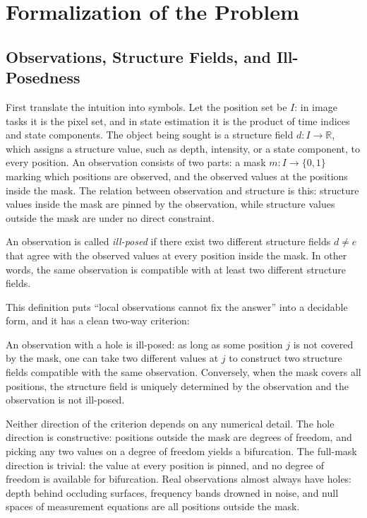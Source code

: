 \section{Formalization of the Problem}
\label{ch:formalize}

\subsection{Observations, Structure Fields, and Ill-Posedness}

First translate the intuition into symbols. Let the position set be $I$: in image tasks it is the pixel set, and in state estimation it is the product of time indices and state components. The object being sought is a structure field $d : I \to \mathbb{R}$, which assigns a structure value, such as depth, intensity, or a state component, to every position. An observation consists of two parts: a mask $m : I \to \{0, 1\}$ marking which positions are observed, and the observed values at the positions inside the mask. The relation between observation and structure is this: structure values inside the mask are pinned by the observation, while structure values outside the mask are under no direct constraint.

\begin{defn}
An observation is called \emph{ill-posed} if there exist two different structure fields $d \neq e$ that agree with the observed values at every position inside the mask. In other words, the same observation is compatible with at least two different structure fields.
\end{defn}

This definition puts ``local observations cannot fix the answer'' into a decidable form, and it has a clean two-way criterion:

\begin{uprop}
An observation with a hole is ill-posed: as long as some position $j$ is not covered by the mask, one can take two different values at $j$ to construct two structure fields compatible with the same observation. Conversely, when the mask covers all positions, the structure field is uniquely determined by the observation and the observation is not ill-posed.
\end{uprop}

Neither direction of the criterion depends on any numerical detail. The hole direction is constructive: positions outside the mask are degrees of freedom, and picking any two values on a degree of freedom yields a bifurcation. The full-mask direction is trivial: the value at every position is pinned, and no degree of freedom is available for bifurcation. Real observations almost always have holes: depth behind occluding surfaces, frequency bands drowned in noise, and null spaces of measurement equations are all positions outside the mask.

